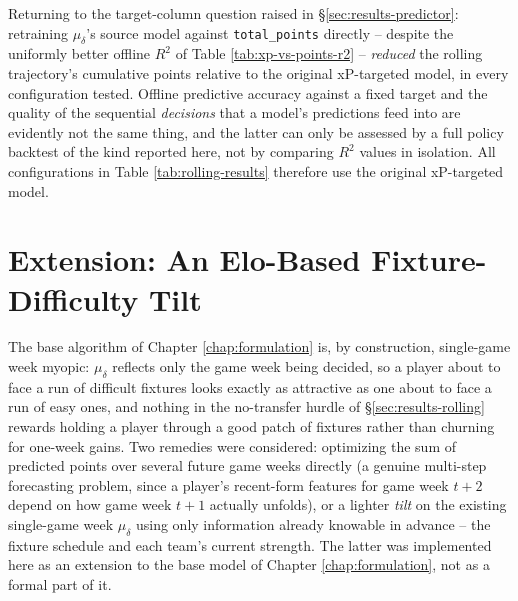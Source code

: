 				Returning to the target-column question raised in \S\ref{sec:results-predictor}: retraining $\mu_\delta$'s source model against \texttt{total\_points} directly -- despite the uniformly better offline $R^2$ of Table \ref{tab:xp-vs-points-r2} -- \emph{reduced} the rolling trajectory's cumulative points relative to the original xP-targeted model, in every configuration tested. Offline predictive accuracy against a fixed target and the quality of the sequential \emph{decisions} that a model's predictions feed into are evidently not the same thing, and the latter can only be assessed by a full policy backtest of the kind reported here, not by comparing $R^2$ values in isolation. All configurations in Table \ref{tab:rolling-results} therefore use the original xP-targeted model.

		\section{Extension: An Elo-Based Fixture-Difficulty Tilt} \label{sec:results-tilt}
			The base algorithm of Chapter \ref{chap:formulation} is, by construction, single-game week myopic: $\mu_\delta$ reflects only the game week being decided, so a player about to face a run of difficult fixtures looks exactly as attractive as one about to face a run of easy ones, and nothing in the no-transfer hurdle of \S\ref{sec:results-rolling} rewards holding a player through a good patch of fixtures rather than churning for one-week gains. Two remedies were considered: optimizing the sum of predicted points over several future game weeks directly (a genuine multi-step forecasting problem, since a player's recent-form features for game week $t+2$ depend on how game week $t+1$ actually unfolds), or a lighter \emph{tilt} on the existing single-game week $\mu_\delta$ using only information already knowable in advance -- the fixture schedule and each team's current strength. The latter was implemented here as an extension to the base model of Chapter \ref{chap:formulation}, not as a formal part of it.


